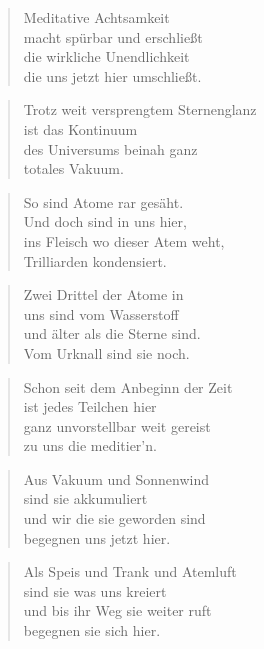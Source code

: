 \documentclass[10pt,a4paper]{article}
\begin{document}
\begin{paracol}{2}
\begin{verse}
Meditative Achtsamkeit \\
macht spürbar und erschließt \\
die wirkliche Unendlichkeit \\
die uns jetzt hier umschließt. \\
\end{verse}

\begin{verse}
Trotz weit versprengtem Sternenglanz \\
ist das Kontinuum \\
des Universums beinah ganz \\
totales Vakuum. \\
\end{verse}

\begin{verse}
So sind Atome rar gesäht. \\
Und doch sind in uns hier, \\
ins Fleisch wo dieser Atem weht, \\
Trilliarden kondensiert. \\
\end{verse}

\begin{verse}
Zwei Drittel der Atome in \\
uns sind vom Wasserstoff \\
und älter als die Sterne sind. \\
Vom Urknall sind sie noch. \\
\end{verse}

\begin{verse}
Schon seit dem Anbeginn der Zeit \\
ist jedes Teilchen hier \\
ganz unvorstellbar weit gereist \\
zu uns die meditier’n. \\
\end{verse}

\begin{verse}
Aus Vakuum und Sonnenwind \\
sind sie akkumuliert \\
und wir die sie geworden sind \\
begegnen uns jetzt hier. \\
\end{verse}

\begin{verse}
Als Speis und Trank und Atemluft \\
sind sie was uns kreiert \\
und bis ihr Weg sie weiter ruft \\
begegnen sie sich hier. \\
\end{verse}


\end{paracol}
\end{document}
